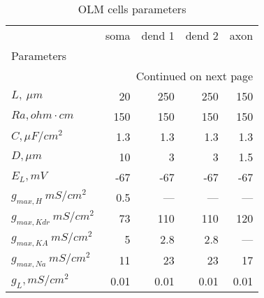 \begin{longtable}{lrrrr}
\caption{OLM cells parameters}\label{ca1__cell_parameters}\\
\toprule
{} & soma & dend 1 & dend 2 &  axon \\
Parameters      &      &        &        &       \\
\midrule
\endhead
\midrule
\multicolumn{5}{r}{{Continued on next page}} \\
\midrule
\endfoot

\bottomrule
\endlastfoot
$L, \ \mu m$ &   20 &    250 &    250 &   150 \\
$Ra,
 ohm \cdot cm$              &  150 &    150 &    150 &   150 \\
$C, \mu F / cm^2$              &  1.3 &    1.3 &    1.3 &   1.3 \\
$D, \mu m$            &   10 &      3 &      3 &   1.5 \\
$E_L,  mV$       &  -67 &    -67 &    -67 &   -67 \\
$g_{max, H  }\  mS / cm^2$&  0.5 &   ---  &   ---  &  ---  \\
$g_{max, Kdr }\  mS / cm^2$&   73 &    110 &    110 &   120 \\
$g_{max, KA  }\  mS / cm^2$&    5 &    2.8 &    2.8 &  ---  \\
$g_{max, Na     }\  mS / cm^2$&   11 &     23 &     23 &    17 \\
$g_L,  mS / cm^2$    & 0.01 &   0.01 &   0.01 &  0.01 \\
\end{longtable}
